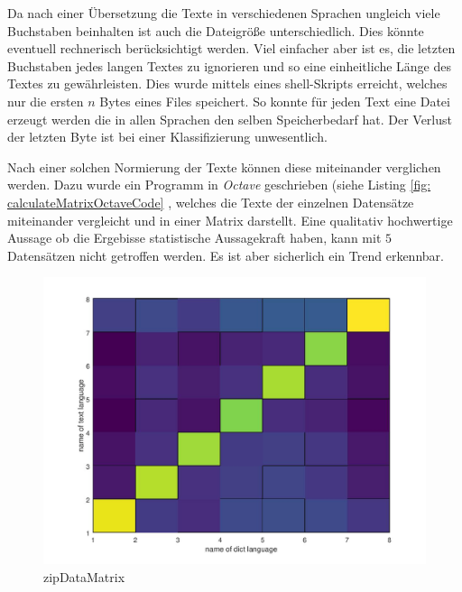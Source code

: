 \documentclass[12pt,german]{article}
\begin{document}
Da nach einer Übersetzung die Texte in verschiedenen Sprachen ungleich viele Buchstaben beinhalten ist auch die Dateigröße unterschiedlich. Dies könnte eventuell rechnerisch berücksichtigt werden. Viel einfacher aber ist es, die letzten Buchstaben jedes langen Textes zu ignorieren und so eine einheitliche Länge des Textes zu gewährleisten. Dies wurde mittels eines shell-Skripts erreicht, welches nur die ersten $n$ Bytes eines Files speichert. So konnte für jeden Text eine Datei erzeugt werden die in allen Sprachen den selben Speicherbedarf hat. Der Verlust der letzten Byte ist bei einer Klassifizierung unwesentlich. 



Nach einer solchen Normierung der Texte können diese miteinander verglichen werden. Dazu wurde ein Programm in \textit{Octave} geschrieben (siehe Listing \ref{fig: calculateMatrixOctaveCode}  , welches die Texte der einzelnen Datensätze miteinander vergleicht und in einer Matrix darstellt. Eine qualitativ hochwertige Aussage ob die Ergebisse statistische Aussagekraft haben, kann mit $5$ Datensätzen nicht getroffen werden. Es ist aber sicherlich ein Trend erkennbar.


\begin{figure}[H]
	\centering
	\includegraphics[width=12cm]{images/resultZipData.jpg}
	\caption{zipDataMatrix}
	\label{fig: zipDataMatrix}
\end{figure}

\newpage

\label{fig: calculateMatrixOctaveCode}
\end{document}
